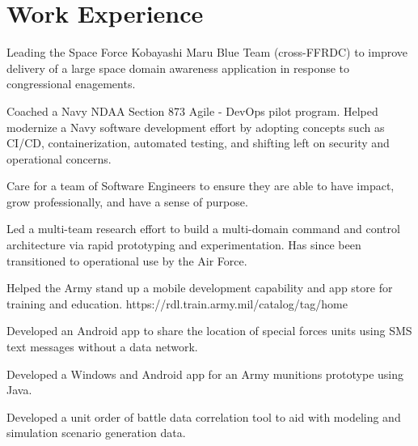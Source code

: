\documentclass[]{deedy-resume-openfont}
\begin{document}
\section{Work Experience}
\hfill {}
\begin{tightemize}
	\item Leading the Space Force Kobayashi Maru Blue Team (cross-FFRDC) to improve delivery of a large space domain awareness application in response to congressional enagements.   
	\item Coached a Navy NDAA Section 873 Agile - DevOps pilot program. Helped modernize a Navy software development effort by adopting concepts such as CI/CD, containerization, automated testing, and shifting left on security and operational concerns.
\end{tightemize}
\sectionsep
{}\hfill {}
\begin{tightemize}
	\item Care for a team of Software Engineers to ensure they are able to have impact, grow professionally, and have a sense of purpose.
\end{tightemize}
\sectionsep
{}\hfill {}
\begin{tightemize}
	\item Led a multi-team research effort to build a multi-domain command and control architecture via rapid prototyping and experimentation. Has since been transitioned to operational use by the Air Force.
	\item Helped the Army stand up a mobile development capability and app store for training and education.  https://rdl.train.army.mil/catalog/tag/home
\end{tightemize}
\sectionsep
{}\hfill {}
\begin{tightemize}
	\item Developed an Android app to share the location of special forces units using SMS text messages without a data network. 
	\item Developed a Windows and Android app for an Army munitions prototype using Java.
\end{tightemize}
\sectionsep
{}\hfill {}
\begin{tightemize}
	\item Developed a unit order of battle data correlation tool to aid with modeling and simulation scenario generation data.
\end{tightemize}
\sectionsep
\end{document}
